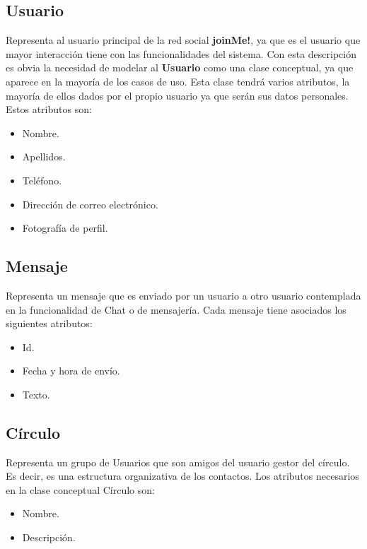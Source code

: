 \documentclass[12pt, a4paper, titlepage]{article}
\begin{document}
\subsection{Usuario}
	Representa al usuario principal de la red social \textbf{joinMe!}, ya que es el usuario que mayor interacción tiene con las funcionalidades del sistema. Con esta descripción es obvia la necesidad de modelar al \textbf{Usuario} como una clase conceptual, ya que aparece en la mayoría de los casos de uso. Esta clase tendrá varios atributos, la mayoría de ellos dados por el propio usuario ya que serán sus datos personales.
	Estos atributos son:
	\begin{itemize}
		\item Nombre.
		\item Apellidos.
		\item Teléfono.
		\item Dirección de correo electrónico.
		\item Fotografía de perfil.
	\end{itemize}
	
\subsection{Mensaje}
	Representa un mensaje que es enviado por un usuario a otro usuario contemplada en la funcionalidad de Chat o de mensajería. Cada mensaje tiene asociados los siguientes atributos:
	\begin{itemize}
		\item Id.
		\item Fecha y hora de envío.
		\item Texto.
	\end{itemize}
\subsection{Círculo}
	Representa un grupo de Usuarios que son amigos del usuario gestor del círculo. Es decir, es una estructura organizativa de los contactos. Los atributos necesarios en la clase conceptual Círculo son:
	\begin{itemize}
		\item Nombre.
		\item Descripción.
	\end{itemize}
\end{document}
